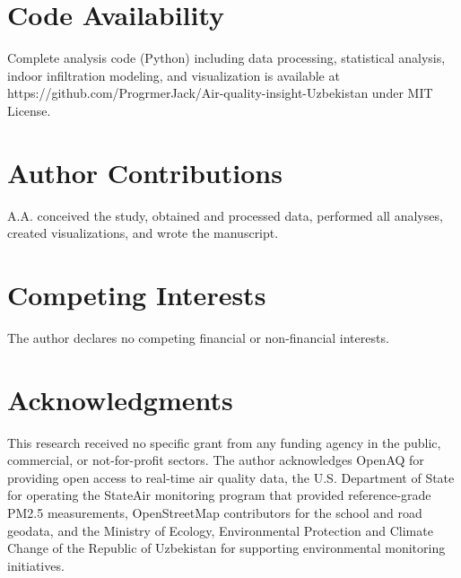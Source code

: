 \documentclass[11pt,a4paper]{article}
\begin{document}
\section*{Code Availability}

Complete analysis code (Python) including data processing, statistical analysis, indoor infiltration modeling, and visualization is available at https://github.com/ProgrmerJack/Air-quality-insight-Uzbekistan under MIT License.

\section*{Author Contributions}

A.A. conceived the study, obtained and processed data, performed all analyses, created visualizations, and wrote the manuscript.

\section*{Competing Interests}

The author declares no competing financial or non-financial interests.

\section*{Acknowledgments}

This research received no specific grant from any funding agency in the public, commercial, or not-for-profit sectors. The author acknowledges OpenAQ for providing open access to real-time air quality data, the U.S. Department of State for operating the StateAir monitoring program that provided reference-grade PM2.5 measurements, OpenStreetMap contributors for the school and road geodata, and the Ministry of Ecology, Environmental Protection and Climate Change of the Republic of Uzbekistan for supporting environmental monitoring initiatives.

\end{document}
